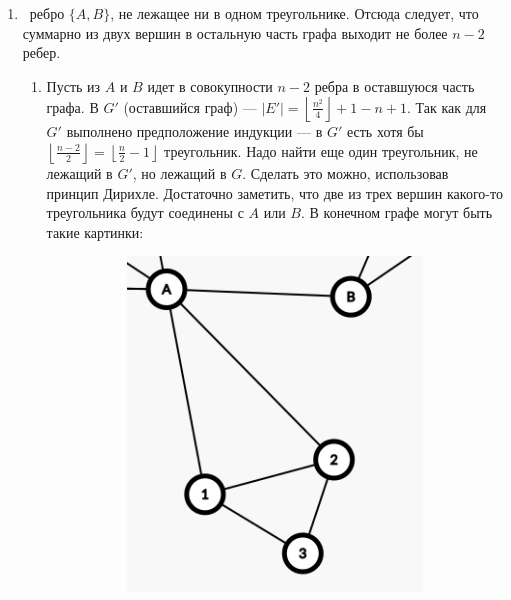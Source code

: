 \begin{solution}
\begin{enumerate}
    \item \exists \ ребро $\{A,B\}$, не лежащее ни в одном треугольнике. Отсюда следует, что суммарно из двух вершин в остальную часть графа выходит не более $n-2$ ребер.
        \begin{enumerate}
            \item Пусть из $A$ и $B$ идет в совокупности $n - 2$ ребра в оставшуюся часть графа. В $G'$ (оставшийся     граф) --- $|E'| = \left\lfloor \frac{n^2}{4}\right\rfloor  + 1 - n + 1$. Так как     для $G'$ выполнено предположение индукции --- в $G'$     есть хотя бы $\left\lfloor \frac{n - 2}{2}\right\rfloor  = \left\lfloor \frac{n}{2} - 1\right\rfloor $ треугольник. Надо найти еще один треугольник, не     лежащий в $G'$, но лежащий в $G$. Сделать это можно, использовав принцип Дирихле. Достаточно заметить, что две из трех вершин какого-то треугольника будут соединены с  $A$ или $B$. В конечном графе могут быть такие картинки:
            \begin{figure}[H]
              \centering
              \begin{subfigure}[a]{0.24\linewidth}
                \includegraphics[width=\linewidth]{_img/340/01.png}
              \end{subfigure}

\end{figure}
\end{enumerate}
\end{enumerate}
\end{solution}
